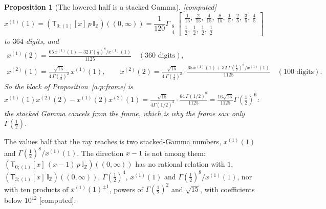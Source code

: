 \documentclass[11pt]{article}
\newcommand{\sT}{\mathsf T}
\newcommand{\Gst}[4]{\Gamma_{\substack{#1\\#2}}\!\begin{bmatrix}#3\\#4\end{bmatrix}}
\newcommand{\IZ}{\mathbb I_{\mathbb Z}}
\newcommand{\Tx}[3]{(\sT_{#1;(1)}[x]\,#2)((#3,\infty))}
\theoremstyle{plain}
\newtheorem{proposition}{Proposition}[section]
\theoremstyle{definition}
\theoremstyle{remark}
\newcommand{\computed}{\textup{[computed]}}
\begin{document}
\begin{proposition}[The lowered half is a stacked Gamma]\label{a:p:stackedhalf}\computed\
\[
x^{(1)}(1)=\Tx{0}{p\,\IZ}{0}=\frac1{120}\Gst84{\tfrac1{15},\ \tfrac2{15},\ \tfrac4{15},\ \tfrac8{15},\ \tfrac15,\ \tfrac25,\ \tfrac35,\ \tfrac45}{\tfrac12,\ \tfrac12,\ \tfrac12,\ \tfrac12}
\]
to $364$ digits, and
\begin{gather*}
x^{(1)}(2)=\frac{65\,x^{(1)}(1)-32\,\Gamma(\frac12)^8/x^{(1)}(1)}{1125}\quad(360\text{ digits}),\\
x^{(2)}(1)=\frac{\sqrt{15}}{4\,\Gamma(\frac12)^2}\,x^{(1)}(1),\qquad x^{(2)}(2)=\frac{\sqrt{15}}{4\,\Gamma(\frac12)^2}\cdot\frac{65\,x^{(1)}(1)+32\,\Gamma(\frac12)^8/x^{(1)}(1)}{1125}\quad(100\text{ digits}).
\end{gather*}
So the block of Proposition~\ref{a:p:frame} is $x^{(1)}(1)x^{(2)}(2)-x^{(1)}(2)x^{(2)}(1)=\frac{\sqrt{15}}{4\Gamma(1/2)^2}\cdot\frac{64\,\Gamma(1/2)^8}{1125}=\frac{16\sqrt{15}}{1125}\Gamma(\frac12)^6$: the stacked Gamma cancels from the frame, which is why the frame saw only $\Gamma(\frac12)$.
\end{proposition}

The values half that the ray reaches is two stacked-Gamma numbers, $x^{(1)}(1)$ and $\Gamma(\frac12)^8/x^{(1)}(1)$. The direction $x-1$ is not among them: $\Tx{0}{(x-1)\,p\,\IZ}{0}$ has no rational relation with $1$, $\Tx{3}{\IZ}{0}$, $\Gamma(\frac12)^4$, $x^{(1)}(1)$ and $\Gamma(\frac12)^8/x^{(1)}(1)$, nor with ten products of $x^{(1)}(1)^{\pm1}$, powers of $\Gamma(\frac12)^2$ and $\sqrt{15}$, with coefficients below $10^{12}$ \computed.
\end{document}
